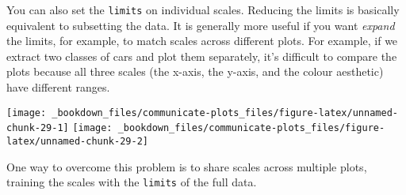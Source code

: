 \documentclass[]{book}
\newenvironment{Shaded}{\begin{snugshade}}{\end{snugshade}}
\newcommand{\KeywordTok}[1]{\textcolor[rgb]{0.13,0.29,0.53}{\textbf{{#1}}}}
\newcommand{\DataTypeTok}[1]{\textcolor[rgb]{0.13,0.29,0.53}{{#1}}}
\newcommand{\StringTok}[1]{\textcolor[rgb]{0.31,0.60,0.02}{{#1}}}
\newcommand{\NormalTok}[1]{{#1}}
\begin{document}
You can also set the \texttt{limits} on individual scales. Reducing the
limits is basically equivalent to subsetting the data. It is generally
more useful if you want \emph{expand} the limits, for example, to match
scales across different plots. For example, if we extract two classes of
cars and plot them separately, it's difficult to compare the plots
because all three scales (the x-axis, the y-axis, and the colour
aesthetic) have different ranges.

\begin{Shaded}
\end{Shaded}

\texttt{[image: \_bookdown\_files/communicate-plots\_files/figure-latex/unnamed-chunk-29-1]}
\texttt{[image: \_bookdown\_files/communicate-plots\_files/figure-latex/unnamed-chunk-29-2]}

One way to overcome this problem is to share scales across multiple
plots, training the scales with the \texttt{limits} of the full data.

\begin{Shaded}
\end{Shaded}
\end{document}

